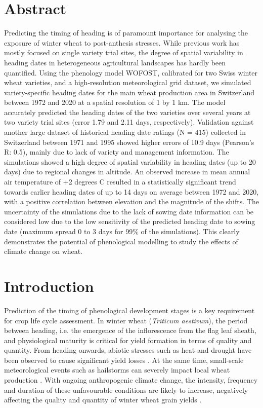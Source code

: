 \section*{Abstract}
Predicting the timing of heading is of paramount importance for analysing the exposure of winter wheat to post-anthesis stresses. While previous work has mostly focused on single variety trial sites, the degree of spatial variability in heading dates in heterogeneous agricultural landscapes has hardly been quantified. 
Using the phenology model WOFOST, calibrated for two Swiss winter wheat varieties, and a high-resolution meteorological grid dataset, we simulated variety-specific heading dates for the main wheat production area in Switzerland between 1972 and 2020 at a spatial resolution of 1 by 1 km. The model accurately predicted the heading dates of the two varieties over several years at two variety trial sites (error 1.79 and 2.11 days, respectively). Validation against another large dataset of historical heading date ratings (N = 415) collected in Switzerland between 1971 and 1995 showed higher errors of 10.9 days (Pearson's R: 0.5), mainly due to lack of variety and management information. The simulations showed a high degree of spatial variability in heading dates (up to 20 days) due to regional changes in altitude. An observed increase in mean annual air temperature of +2 degrees C resulted in a statistically significant trend towards earlier heading dates of up to 14 days on average between 1972 and 2020, with a positive correlation between elevation and the magnitude of the shifts. The uncertainty of the simulations due to the lack of sowing date information can be considered low due to the low sensitivity of the predicted heading date to sowing date (maximum spread 0 to 3 days for 99\% of the simulations). This clearly demonstrates the potential of phenological modelling to study the effects of climate change on wheat.

\section{Introduction}
Prediction of the timing of phenological development stages is a key requirement for crop life cycle assessment. In winter wheat (\textsl{Triticum aestivum}), the period between heading, i.e. the emergence of the inflorescence from the flag leaf sheath, and physiological maturity is critical for yield formation in terms of quality and quantity. From heading onwards, abiotic stresses such as heat and drought have been observed to cause significant yield losses \citep{porter_temperatures_1999, barlow_simulating_2015, rezaei_heat_2015}. At the same time, small-scale meteorological events such as hailstorms can severely impact local wheat production \citep{holman_impact_2022}. With ongoing anthropogenic climate change, the intensity, frequency and duration of these unfavourable conditions are likely to increase, negatively affecting the quality and quantity of winter wheat grain yields \citep{asseng_climate_2019, bonecke_decoupling_2020, pequeno_climate_2021, zhang_climate_2022}.


